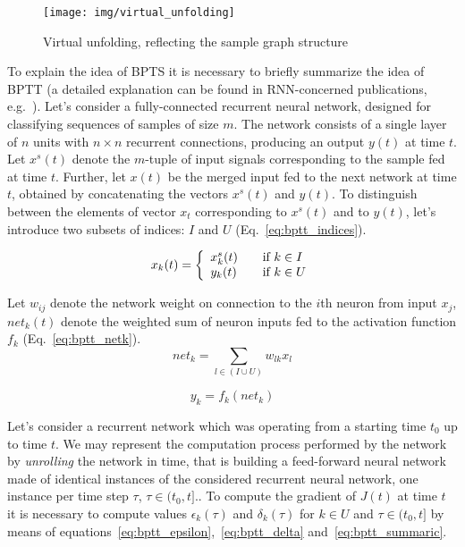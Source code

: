 \begin{figure}
\begin{center}
	\texttt{[image: img/virtual\_unfolding]}
	\caption{Virtual unfolding, reflecting the sample graph structure}
	\label{fig:virtual_unfolding}
\end{center}
\end{figure}

To explain the idea of BPTS it is necessary to briefly summarize the idea of BPTT (a detailed explanation can be found in RNN-concerned publications, e.g.~\cite{williams1995gradient}). Let's consider a fully-connected recurrent neural network, designed for classifying sequences of samples of size $m$. The network consists of a single layer of $n$ units with $n \times n$ recurrent connections, producing an output $y(t)$ at time $t$. Let $x^{s}(t)$ denote the $m$-tuple of input signals corresponding to the sample fed at time $t$. Further, let $x(t)$ be the merged input fed to the next network at time $t$, obtained by concatenating the vectors $x^{s}(t)$ and $y(t)$. To distinguish between the elements of vector $x_t$ corresponding to $x^{s}(t)$ and to $y(t)$, let's introduce two subsets of indices: $I$ and $U$ (Eq.~\ref{eq:bptt_indices}).

\begin{equation}
x_k(t) = \left\{
\begin{array}{l l}
	x^{s}_{k}(t)	& \quad \text{if $k \in I$} \\
	y_k(t)	& \quad \text{if $k \in U$}\\
\end{array} \right.
\label{eq:bptt_indices}
\end{equation}

\noindent Let $w_{ij}$ denote the network weight on connection to the $i$th neuron from input $x_j$, $net_k(t)$ denote the weighted sum of neuron inputs fed to the activation function $f_k$ (Eq.~\ref{eq:bptt_netk}).
\begin{equation}
net_k = \sum_{l \in (I \cup U)} w_{lk} x_l
\label{eq:bptt_netk}
\end{equation}

\begin{equation}
y_k = f_k(net_k)
\label{eq:bptt_f}
\end{equation}

\noindent Let's consider a recurrent network which was operating from a starting time $t_0$ up to time $t$. We may represent the computation process performed by the network by \emph{unrolling} the network in time, that is building a feed-forward neural network made of identical instances of the considered recurrent neural network, one instance per time step $\tau$, $\tau \in (t_0, t]$.. To compute the gradient of $J(t)$ at time $t$ it is necessary to compute values $\epsilon_k(\tau)$ and $\delta_k(\tau)$ for $k \in U$ and $\tau \in (t_0, t]$ by means of equations~\ref{eq:bptt_epsilon},~\ref{eq:bptt_delta} and~\ref{eq:bptt_summaric}.

